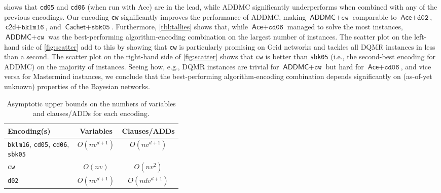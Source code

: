  shows that \texttt{cd05}
\citep{DBLP:conf/ijcai/ChaviraD05} and \texttt{cd06}
\citep{DBLP:conf/sat/ChaviraD06} (when run with \textsf{Ace}) are in the lead,
while \textsf{ADDMC} \citep{DBLP:conf/aaai/DudekPV20} significantly
underperforms when combined with any of the previous encodings. Our encoding
\texttt{cw} significantly improves the performance of \textsf{ADDMC}, making
$\textsf{ADDMC}+\texttt{cw}$ comparable to $\textsf{Ace}+\texttt{d02}$,
$\textsf{c2d}+\texttt{bklm16}$, and $\textsf{Cachet}+\texttt{sbk05}$.
Furthermore, \cref{tbl:tallies} shows that, while $\textsf{Ace}+\texttt{cd06}$
managed to solve the most instances, $\textsf{ADDMC}+\texttt{cw}$ was the
best-performing algorithm-encoding combination on the largest number of
instances. The scatter plot on the left-hand side of \cref{fig:scatter} add to
this by showing that \texttt{cw} is particularly promising on Grid networks and
tackles all DQMR instances in less than a second. The scatter plot on the
right-hand side of \cref{fig:scatter} shows that \texttt{cw} is better than
\texttt{sbk05} \citep{DBLP:conf/aaai/SangBK05} (i.e., the second-best encoding
for \textsf{ADDMC}) on the majority of instances. Seeing how, e.g., DQMR
instances are trivial for $\textsf{ADDMC}+\texttt{cw}$ but hard for
$\textsf{Ace}+\texttt{cd06}$, and vice versa for Mastermind instances, we
conclude that the best-performing algorithm-encoding combination depends
significantly on (as-of-yet unknown) properties of the Bayesian networks.

\begin{table}
  \centering
  \caption{Asymptotic upper bounds on the numbers of variables and clauses/ADDs
    for each encoding.}
  \label{tbl:asymptotes}
  \begin{tabular}{m{0.4\linewidth} c c}
    \toprule
    Encoding(s) & Variables & Clauses/ADDs \\
    \midrule
    \texttt{bklm16}, \texttt{cd05}, \texttt{cd06}, \texttt{sbk05} & $O(nv^{d+1})$ & $O(nv^{d+1})$ \\
    \texttt{cw} & $O(nv)$ & $O(nv^2)$ \\
    \texttt{d02} & $O(nv^{d+1})$ & $O(ndv^{d+1})$ \\
    \bottomrule
  \end{tabular}
\end{table}

